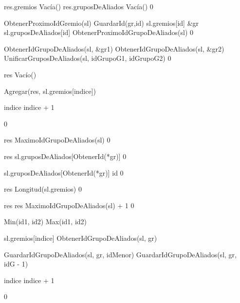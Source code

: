 {
	\state res.gremios \asig Vacía()
	\state res.gruposDeAliados \asig Vacía()
}
{0}

{
	\state {} \asig ObtenerProximoIdGremio(sl)
	\state
	\state GuardarId(gr,id)
	\state sl.gremios[id] \asig \&gr
	\state sl.gruposDeAliados[id] \asig ObtenerProximoIdGrupoDeAliados(sl)
}
{0}

{
	\state {} \asig ObtenerIdGrupoDeAliados(sl, \&gr1)
	\state {} \asig ObtenerIdGrupoDeAliados(sl, \&gr2)
	\state 
	\state UnificarGruposDeAliados(sl, idGrupoG1, idGrupoG2)
}
{0}

{
	\state res \asig Vacío()

	\state
	\state {} 
		\state

		\state Agregar(res, sl.gremios[indice])

		\state
		\state indice \asig indice + 1
	\endwhile
}
{0}

{
	\state res \asig MaximoIdGrupoDeAliados(sl)
}
{0}

{
	\state res \asig sl.gruposDeAliados[ObtenerId(*gr)]
}
{0}

{
	\state sl.gruposDeAliados[ObtenerId(*gr)] \asig id
}
{0}

{
	\state res \asig Longitud(sl.gremios)
}
{0}

{
		\state res 
	\Else
		\state res \asig MaximoIdGrupoDeAliados(sl) + 1
	\endif
}
{0}

{
	\state {} \asig Min(id1, id2)
	\state {} \asig Max(id1, id2)
	\state

	\state {} 

		\state

		\state {} \asig sl.gremios[indice]
		\state {} \asig ObtenerIdGrupoDeAliados(sl, gr)
		\state

			\state GuardarIdGrupoDeAliados(sl, gr, idMenor)
		\Else {}
				\state GuardarIdGrupoDeAliados(sl, gr, idG - 1)
			\endif
		\endif
		\state

		\state indice \asig indice + 1
	\endwhile
}
{0}

